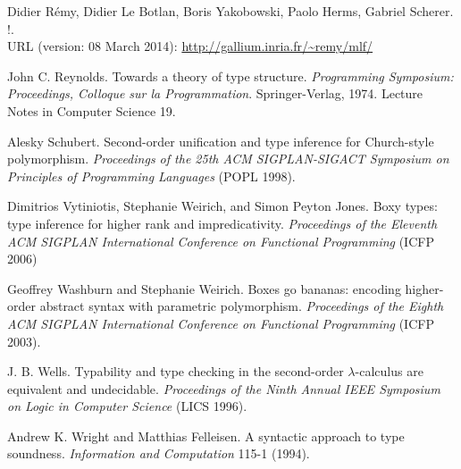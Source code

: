 \begin{thebibliography}{99}
Didier R\'emy, Didier Le Botlan, Boris Yakobowski, Paolo Herms,
Gabriel Scherer.
\MLF!.\\
URL (version: 08 March 2014):
\hbox{\url{http://gallium.inria.fr/~remy/mlf/}}

John C. Reynolds.
Towards a theory of type structure.
\emph{Programming Symposium: Proceedings, Colloque sur
la Programmation}. Springer-Verlag, 1974. Lecture Notes in
Computer Science 19.

Alesky Schubert.
Second-order unification and type inference for Church-style
polymorphism.
\emph{Proceedings of the 25th ACM SIGPLAN-SIGACT Symposium on
Principles of Programming Languages} (POPL 1998).

Dimitrios Vytiniotis, Stephanie Weirich, and Simon Peyton Jones.
Boxy types: type inference for higher rank and impredicativity.
\emph{Proceedings of the Eleventh ACM SIGPLAN International
Conference on Functional Programming} (ICFP 2006)

Geoffrey Washburn and Stephanie Weirich.
Boxes go bananas: encoding higher-order abstract syntax with
parametric polymorphism.
\emph{Proceedings of the Eighth ACM SIGPLAN International
Conference on Functional Programming} (ICFP 2003).

J. B. Wells.
Typability and type checking in the second-order
$\lambda$-calculus are equivalent and undecidable.
\emph{Proceedings of the Ninth Annual IEEE Symposium on Logic in
Computer Science} (LICS 1996).

Andrew K. Wright and Matthias Felleisen.
A syntactic approach to type soundness.
\emph{Information and Computation} 115-1 (1994).
\end{thebibliography}

